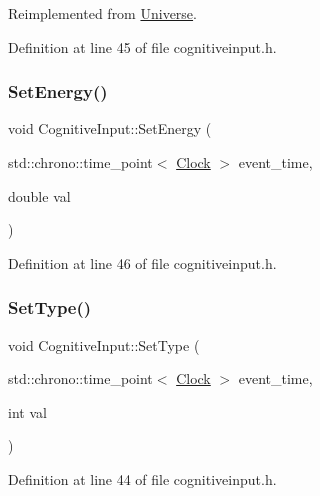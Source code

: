 Reimplemented from \hyperlink{class_universe_aa22202ae740eb1355529afcb13285e91}{Universe}.



Definition at line 45 of file cognitiveinput.\+h.

\mbox{\label{class_cognitive_input_a3498a8b5333606ef4d089e6c427ddf74}} 
\subsubsection{\texorpdfstring{Set\+Energy()}{SetEnergy()}}
{\footnotesize\ttfamily void Cognitive\+Input\+::\+Set\+Energy (\begin{DoxyParamCaption}\item[{std\+::chrono\+::time\+\_\+point$<$ \hyperlink{universe_8h_a0ef8d951d1ca5ab3cfaf7ab4c7a6fd80}{Clock} $>$}]{event\+\_\+time,  }\item[{double}]{val }\end{DoxyParamCaption})\hspace{0.3cm}{\ttfamily [inline]}}



Definition at line 46 of file cognitiveinput.\+h.

\mbox{\label{class_cognitive_input_a37d38512fb190431b4baf8f990c077a9}} 
\subsubsection{\texorpdfstring{Set\+Type()}{SetType()}}
{\footnotesize\ttfamily void Cognitive\+Input\+::\+Set\+Type (\begin{DoxyParamCaption}\item[{std\+::chrono\+::time\+\_\+point$<$ \hyperlink{universe_8h_a0ef8d951d1ca5ab3cfaf7ab4c7a6fd80}{Clock} $>$}]{event\+\_\+time,  }\item[{int}]{val }\end{DoxyParamCaption})\hspace{0.3cm}{\ttfamily [inline]}}



Definition at line 44 of file cognitiveinput.\+h.

